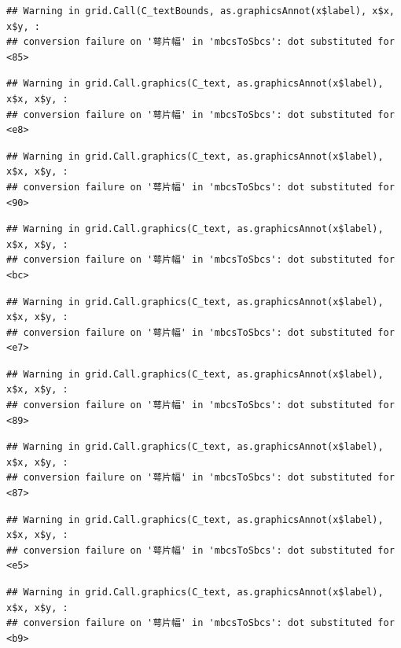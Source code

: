 \documentclass[
]{book}
\begin{document}
\begin{verbatim}
## Warning in grid.Call(C_textBounds, as.graphicsAnnot(x$label), x$x, x$y, :
## conversion failure on '萼片幅' in 'mbcsToSbcs': dot substituted for <85>
\end{verbatim}

\begin{verbatim}
## Warning in grid.Call.graphics(C_text, as.graphicsAnnot(x$label), x$x, x$y, :
## conversion failure on '萼片幅' in 'mbcsToSbcs': dot substituted for <e8>
\end{verbatim}

\begin{verbatim}
## Warning in grid.Call.graphics(C_text, as.graphicsAnnot(x$label), x$x, x$y, :
## conversion failure on '萼片幅' in 'mbcsToSbcs': dot substituted for <90>
\end{verbatim}

\begin{verbatim}
## Warning in grid.Call.graphics(C_text, as.graphicsAnnot(x$label), x$x, x$y, :
## conversion failure on '萼片幅' in 'mbcsToSbcs': dot substituted for <bc>
\end{verbatim}

\begin{verbatim}
## Warning in grid.Call.graphics(C_text, as.graphicsAnnot(x$label), x$x, x$y, :
## conversion failure on '萼片幅' in 'mbcsToSbcs': dot substituted for <e7>
\end{verbatim}

\begin{verbatim}
## Warning in grid.Call.graphics(C_text, as.graphicsAnnot(x$label), x$x, x$y, :
## conversion failure on '萼片幅' in 'mbcsToSbcs': dot substituted for <89>
\end{verbatim}

\begin{verbatim}
## Warning in grid.Call.graphics(C_text, as.graphicsAnnot(x$label), x$x, x$y, :
## conversion failure on '萼片幅' in 'mbcsToSbcs': dot substituted for <87>
\end{verbatim}

\begin{verbatim}
## Warning in grid.Call.graphics(C_text, as.graphicsAnnot(x$label), x$x, x$y, :
## conversion failure on '萼片幅' in 'mbcsToSbcs': dot substituted for <e5>
\end{verbatim}

\begin{verbatim}
## Warning in grid.Call.graphics(C_text, as.graphicsAnnot(x$label), x$x, x$y, :
## conversion failure on '萼片幅' in 'mbcsToSbcs': dot substituted for <b9>
\end{verbatim}
\end{document}
